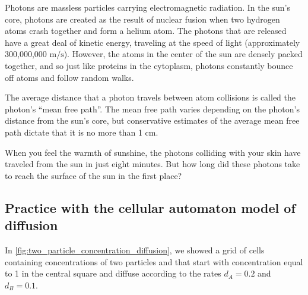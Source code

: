 Photons are massless particles carrying electromagnetic radiation. In the sun's core, photons are created as the result of nuclear fusion when two hydrogen atoms crash together and form a helium atom. The photons that are released have a great deal of kinetic energy, traveling at the speed of light (approximately 300,000,000 $\text{m}/\text{s}$). However, the atoms in the center of the sun are densely packed together, and so just like proteins in the cytoplasm, photons constantly bounce off atoms and follow random walks.

The average distance that a photon travels between atom collisions is called the photon's ``mean free path''. The mean free path varies depending on the photon's distance from the sun's core, but conservative estimates of the average mean free path dictate that it is no more than 1 cm.\\

\begin{exercise}\end{exercise}

When you feel the warmth of sunshine, the photons colliding with your skin have traveled from the sun in just eight minutes. But how long did these photons take to reach the surface of the sun in the first place?\\

\begin{exercise}\end{exercise}

\subsection{Practice with the cellular automaton model of diffusion}

In \autoref{fig:two_particle_concentration_diffusion}, we showed a grid of cells containing concentrations of two particles  and  that start with concentration equal to 1 in the central square and diffuse according to the rates $d_A = 0.2$ and $d_B = 0.1$.\\

